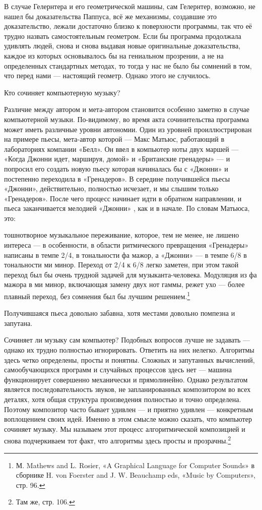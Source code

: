 \documentclass[../main.tex]{subfiles}
\begin{document}
В случае Гелернтера и его геометрической машины, сам Гелернтер, возможно, не нашел бы доказательства Паппуса, всё же механизмы, создавшие это доказательство, лежали достаточно близко к поверхности программы, так что её трудно назвать самостоятельным геометром. Если бы программа продолжала удивлять людей, снова и снова выдавая новые оригинальные доказательства, каждое из которых основывалось бы на гениальном прозрении, а не на определенных стандартных методах, то тогда у нас не было бы сомнений в том, что перед нами --- настоящий геометр. Однако этого не случилось.

Кто сочиняет компьютерную музыку?

Различие между автором и мета-автором становится особенно заметно в случае компьютерной музыки. По-видимому, во время акта сочинительства программа может иметь различные уровни автономии. Один из уровней проиллюстрирован на примере пьесы, мета-автор которой --- Макс Матьюс, работающий в лабораториях компании «Белл». Он ввел в компьютер ноты двух маршей --- «Когда Джонни идет, маршируя, домой» и «Британские гренадеры» --- и попросил его создать новую пьесу которая начиналась бы с «Джонни» и постепенно переходила в «Гренадеров». В середине получившейся пьесы «Джонни», действительно, полностью исчезает, и мы слышим только «Гренадеров». После чего процесс начинает идти в обратном направлении, и пьеса заканчивается мелодией «Джонни» , как и в начале. По словам Матьюса, это:

тошнотворное музыкальное переживание, которое, тем не менее, не лишено интереса --- в особенности, в области ритмического превращения «Гренадеры» написаны в темпе 2/4, в тональности фа мажор, а «Джонни» --- в темпе 6/8 в тональности ми минор. Переход от 2/4 к 6/8 легко заметен, при этом такой переход был бы очень трудной задачей для музыканта-человека. Модуляция из фа мажора в ми минор, включающая замену двух нот гаммы, режет ухо --- более плавный переход, без сомнения был бы лучшим решением.\footnote{М. Mathews and L. Rosier, «A Graphical Language for Computer Sounds» в сборнике H. von Foerster and J. W. Beauchamp eds, «Music by Computers», стр. 96.}

Получившаяся пьеса довольно забавна, хотя местами довольно помпезна и запутана.

Сочиняет ли музыку сам компьютер? Подобных вопросов лучше не задавать --- однако их трудно полностью игнорировать. Ответить на них нелегко. Алгоритмы здесь четко определены, просты и понятны. Сложных и запутанных вычислений, самообучающихся программ и случайных процессов здесь нет --- машина функционирует совершенно механически и прямолинейно. Однако результатом является последовательность звуков, не запланированных композитором во всех деталях, хотя общая структура произведения полностью и точно определена. Поэтому композитор часто бывает удивлен --- и приятно удивлен --- конкретным воплощением своих идей. Именно в этом смысле можно сказать, что компьютер сочиняет музыку. Мы называем этот процесс алгоритмической композицией и снова подчеркиваем тот факт, что алгоритмы здесь просты и прозрачны.\footnote{Там же, стр. 106.}
\end{document}
